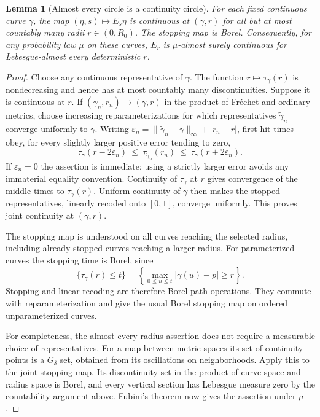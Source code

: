 \documentclass[11pt]{article}
\newtheorem{lemma}[theorem]{Lemma}
\theoremstyle{definition}\newtheorem{definition}[theorem]{Definition}
\theoremstyle{remark}\newtheorem{remark}[theorem]{Remark}
\begin{document}
\begin{lemma}[Almost every circle is a continuity circle]
\label{lem:lt-stopcontinuity}
For each fixed continuous curve $\gamma$, the map
$(\eta,s)\mapsto E_s\eta$ is continuous at $(\gamma,r)$ for all but at most
countably many radii $r\in(0,R_0)$. The stopping map is Borel.
Consequently, for any probability law $\mu$ on these curves, $E_r$ is
$\mu$-almost surely continuous for Lebesgue-almost every deterministic $r$.
\end{lemma}
\begin{proof}
Choose any continuous representative of $\gamma$.
The function $r\mapsto\tau_\gamma(r)$ is nondecreasing and hence has at
most countably many discontinuities. Suppose it is continuous at $r$.
If $(\gamma_n,r_n)\to(\gamma,r)$ in the product of Fr\'echet and ordinary
metrics, choose increasing reparameterizations for which representatives
$\widetilde\gamma_n$ converge uniformly to $\gamma$.
Writing $\varepsilon_n=\|\widetilde\gamma_n-\gamma\|_\infty+|r_n-r|$,
first-hit times obey, for every slightly larger positive error tending to zero,
\[
 \tau_\gamma(r-2\varepsilon_n)
 \ \leq\ \tau_{\widetilde\gamma_n}(r_n)
 \ \leq\ \tau_\gamma(r+2\varepsilon_n).
 \tag{LT2}
\]
If $\varepsilon_n=0$ the assertion is immediate; using a strictly larger error
avoids any immaterial equality convention. Continuity of $\tau_\gamma$ at
$r$ gives convergence of the middle times to $\tau_\gamma(r)$.
Uniform continuity of $\gamma$ then makes the stopped representatives,
linearly recoded onto $[0,1]$, converge uniformly. This proves joint
continuity at $(\gamma,r)$.

The stopping map is understood on all curves reaching the selected radius, including already stopped curves reaching a larger radius. For parameterized curves the stopping time is Borel, since
\[
 \{\tau_\gamma(r)\leq t\}
 =\left\{\max_{0\leq u\leq t}|\gamma(u)-p|\geq r\right\}.
\]
Stopping and linear recoding are therefore Borel path operations. They
commute with reparameterization and give the usual Borel stopping map on
ordered unparameterized curves.

For completeness, the almost-every-radius assertion does not require a
measurable choice of representatives. For a map between metric spaces its
set of continuity points is a $G_\delta$ set, obtained from its oscillations
on neighborhoods. Apply this to the joint stopping map. Its discontinuity
set in the product of curve space and radius space is Borel, and every
vertical section has Lebesgue measure zero by the countability argument
above. Fubini's theorem now gives the assertion under $\mu$.
\end{proof}
\end{document}
